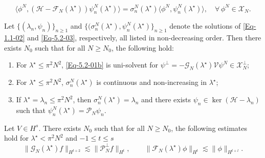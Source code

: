 \documentclass[10pt,a4paper]{amsart}
\begin{document}
\begin{equation}
\label{Eq-5.2-03}
       \langle \phi^N, (\mathcal{H}-\mathcal{F}_N(\lambda^{\star}))\psi^N_n(\lambda^{\star}) \rangle  = \sigma_n^N(\lambda^{\star}) \langle \phi^N, \psi^N_n(\lambda^{\star})\rangle,\quad \forall\,\phi^N\in \mathscr{X}_N.
\end{equation}

\begin{lemma}\label{Lem5.6}
    Let 
    $\{(\lambda_n,\psi_n)\}_{n\geq 1}$
    and $\{(\sigma_n^N(\lambda^{\star}),\psi^N_n(\lambda^{\star})\}_{n\geq 1}$ denote the solutions of \eqref{Eq-1.1-02} and \eqref{Eq-5.2-03}, respectively, all listed in non-decreasing order. Then there exists $N_0$ such that for all $N\geq N_0$, the following hold:
    
    \begin{enumerate}
    \item[$\mathrm{(i)}$] For $\lambda^{\star}\leq \pi^2N^2$, \eqref{Eq-5.2-01b} is uni-solvent for $\psi^\perp =-\mathcal{G}_N(\lambda^\star) \mathcal{V} \psi^N\in \mathscr{X}_N^\perp$;
    
    \item[$\mathrm{(ii)}$] For $\lambda^{\star} \leq \pi^2 N^2$,  $\sigma_n^N(\lambda^{\star})$ is continuous and non-increasing in $\lambda^{\star}$;
    
    \item[$\mathrm{(iii)}$] If $\lambda^\star=\lambda_n \leq \pi^2N^2$, then $\sigma_n^N(\lambda^\star) = \lambda_n$ and there exists $\psi_n \in \ker(\mathcal{H}-\lambda_n)$ such that $\psi^N_n(\lambda^\star) = \mathcal{P}_N\psi_n$.
    \end{enumerate}
\end{lemma}

\begin{lemma}\label{Lem5.7}
    Let $V\in H^{s}$. There exists $N_0$ such that for all $N\geq N_0$, the following estimates hold for $\lambda^\star < \pi ^2N^2$ and $-1\leq t\leq s$
    \begin{equation}
        \|\mathcal{G}_N(\lambda^\star)f\|_{H^{t+2}}\lesssim \|\mathcal{P}^\perp_Nf\|_{H^{t}},\qquad
        \|\mathcal{F}_N(\lambda^\star)\phi\|_{H^{t}}\lesssim \|\phi\|_{H^{t+l}}.
    \end{equation}
\end{lemma}
\end{document}
